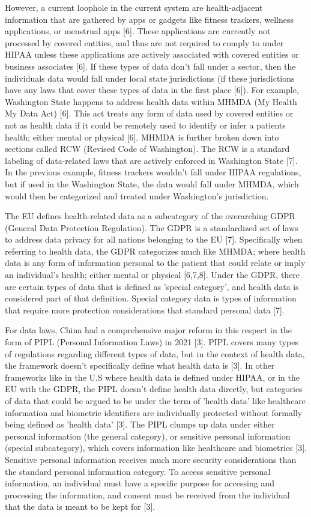 \documentclass[conference]{IEEEtran}
\begin{document}
However, a current loophole in the current system are health-adjacent information that are gathered by apps or gadgets like fitness trackers, wellness applications, or menstrual apps [6]. These applications are currently not processed by covered entities, and thus are not required to comply to under HIPAA unless these applications are actively associated with covered entities or business associates [6]. If these types of data don't fall under a sector, then  the individuals data would fall under local state jurisdictions (if these jurisdictions have any laws that cover these types of data in the first place [6]). For example, Washington State happens to address health data within MHMDA (My Health My Data Act) [6]. This act treats any form of data used by covered entities or not as health data if it could be remotely used to identify or infer a patients health; either mental or physical [6]. MHMDA is further broken down into sections called RCW (Revised Code of Washington). The RCW is a standard labeling of data-related laws that are actively enforced in Washington State [7]. In the previous example, fitness trackers wouldn't fall under HIPAA regulations, but if used in the Washington State, the data would fall under MHMDA, which would then be categorized and treated under Washington's jurisdiction.

The EU defines health-related data as a subcategory of the overarching GDPR (General Data Protection Regulation). The GDPR is a standardized set of laws to address data privacy for all nations belonging to the EU [7]. Specifically when referring to health data, the GDPR categorizes much like MHMDA; where health data is any form of information personal to the patient that could relate or imply an individual's health; either mental or physical [6,7,8]. Under the GDPR, there are certain types of data that is defined as 'special category', and health data is considered part of that definition. Special category data is types of information that require more protection considerations that standard personal data [7]. 

For data laws, China had a comprehensive major reform in this respect in the form of PIPL (Personal Information Laws) in 2021 [3]. PIPL covers many types of regulations regarding different types of data, but in the context of health data, the framework doesn't specifically define what health data is [3]. In other frameworks like in the U.S where health data is defined under HIPAA, or in the EU with the GDPR, the PIPL doesn't define health data directly, but categories of data that could be argued to be under the term of 'health data' like healthcare information and biometric identifiers are individually protected without formally being defined as 'health data' [3]. The PIPL clumps up data under either personal information (the general category), or sensitive personal information (special subcategory), which covers information like healthcare and biometrics [3]. Sensitive personal information receives much more security considerations than the standard personal information category. To access sensitive personal information, an individual must have a specific purpose for accessing and processing the information, and consent must be received from the individual that the data is meant to be kept for [3].  
\end{document}
